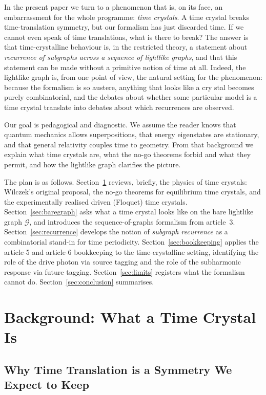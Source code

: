 \documentclass[11pt]{article}
\begin{document}
In the present paper we turn to a phenomenon that is, on its face, an embarrassment for the whole programme: \emph{time crystals}. A time crystal breaks time-translation symmetry, but our formalism has just discarded time. If we cannot even speak of time translations, what is there to break? The answer is that time-crystalline behaviour is, in the restricted theory, a statement about \emph{recurrence of subgraphs across a sequence of lightlike graphs}, and that this statement can be made without a primitive notion of time at all. Indeed, the lightlike graph is, from one point of view, the natural setting for the phenomenon: because the formalism is so austere, anything that looks like a cry stal becomes purely combinatorial, and the debates about whether some particular model is a time crystal translate into debates about which recurrences are observed.

Our goal is pedagogical and diagnostic. We assume the reader knows that quantum mechanics allows superpositions, that energy eigenstates are stationary, and that general relativity couples time to geometry. From that background we explain what time crystals are, what the no-go theorems forbid and what they permit, and how the lightlike graph clarifies the picture.

The plan is as follows. Section~\ref{sec:background} reviews, briefly, the physics of time crystals: Wilczek's original proposal, the no-go theorems for equilibrium time crystals, and the experimentally realised driven (Floquet) time crystals. Section~\ref{sec:baregraph} asks what a time crystal looks like on the bare lightlike graph $\mathcal{G}$, and introduces the sequence-of-graphs formalism from article~3. Section~\ref{sec:recurrence} develops the notion of \emph{subgraph recurrence} as a combinatorial stand-in for time periodicity. Section~\ref{sec:bookkeeping} applies the article-5 and article-6 bookkeeping to the time-crystalline setting, identifying the role of the drive photon via source tagging and the role of the subharmonic response via future tagging. Section~\ref{sec:limits} registers what the formalism cannot do. Section~\ref{sec:conclusion} summarises.

\section{Background: What a Time Crystal Is}
\label{sec:background}

\subsection{Why Time Translation is a Symmetry We Expect to Keep}
\end{document}
